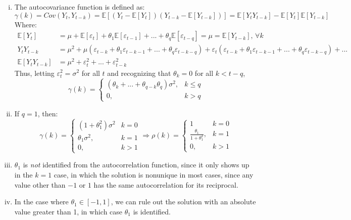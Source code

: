 \documentclass{article}
\newcommand{\E}[1]{\mathbb{E}\left[#1\right]}%
\begin{document}
\begin{enumerate}[(i)]
	\item The autocovariance function is defined as:
		\[
			\gamma(k) = Cov(Y_t,Y_{t-k}) = \E{\left(Y_t - \E{Y_t}\right)\left(Y_{t-k} - \E{Y_{t-k}}\right)} = \E{Y_tY_{t-k}} - \E{Y_{t}}\E{Y_{t-k}}
		\]
		Where:
		\begin{align*}
			\E{Y_t} 	&= \mu + \E{\varepsilon_t} + \theta_1\E{\varepsilon_{t-1}} + ... + \theta_q\E{\varepsilon_{t-q}} = \mu = \E{Y_{t-k}}\text{, }\forall k	\\
			Y_tY_{t-k}	&= \mu^2 + \mu\left(\varepsilon_{t-k}+ \theta_1\varepsilon_{t-k-1}+ ... + \theta_q\varepsilon_{t-k-q}\right) 
							+ \varepsilon_t\left(\varepsilon_{t-k}+ \theta_1\varepsilon_{t-k-1}+ ... + \theta_q\varepsilon_{t-k-q}\right) + ...							\\
		\E{Y_tY_{t-k}}	&= \mu^2 + \varepsilon_t^2 + ... + \varepsilon_{t-k}^2			
		\end{align*}
		Thus, letting ${\varepsilon_t^2 = \sigma^2}$ for all $t$ and recognizing that ${\theta_k=0}$ for all ${k<t-q}$,
		\[
			\gamma(k) = \begin{cases} 
							\left(\theta_k + ... + \theta_{q-k}\theta_q\right)\sigma^2, 	& k\leq q \\ 
							0, 																& k>q 
						\end{cases}
		\]
	
	\item If ${q=1}$, then:
		\[
			\gamma(k) =  \begin{cases} 
							\left(1 + \theta_1^2\right)\sigma^2	& k = 0	\\
							\theta_1\sigma^2, 					& k = 1 \\ 
							0, 									& k>1
						\end{cases} \Rightarrow 
			\rho(k) =  \begin{cases} 
							1									& k = 0	\\
							\frac{\theta_1}{1 + \theta_1^2}, 	& k = 1 \\ 
							0, 									& k>1
						\end{cases}
		\]
	
	\item $\theta_1$ is \textit{not} identified from the autocorrelation function, since it only shows up in the $k=1$ case, in which the solution is nonunique in most cases, since any value other than $-1$ or $1$ has the same autocorrelation for its reciprocal.
	
	
	\item In the case where $\theta_1\in[-1,1]$, we can rule out the solution with an absolute value greater than 1, in which case $\theta_1$ is identified.
	
\end{enumerate}
\end{document}

